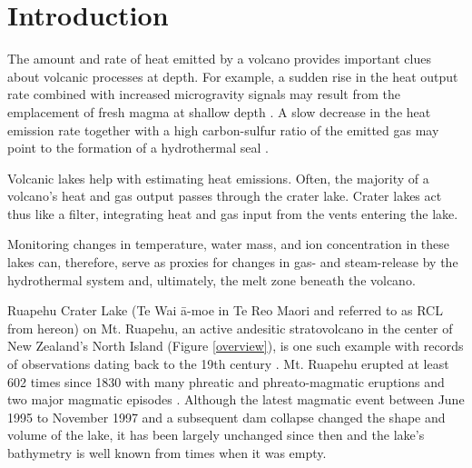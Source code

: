 \documentclass[doublespacing]{bmcart}
\begin{document}


\section{Introduction}

The amount and rate of heat emitted by a volcano provides important clues about
volcanic processes at depth. For example, a sudden rise in the heat output rate
combined with increased microgravity signals may result from the emplacement of
fresh magma at shallow depth \cite{Brown1991}. A slow decrease in the heat
emission rate together with a high carbon-sulfur ratio of the emitted gas may
point to the formation of a hydrothermal seal
\cite{christensonCyclicProcessesFactors2010}.

Volcanic lakes help with estimating heat emissions. Often, the majority of a
volcano's heat and gas output passes through the crater lake. Crater lakes act thus
like a filter, integrating heat and gas input from the vents entering the lake.

Monitoring changes in temperature, water mass, and ion concentration in these
lakes can, therefore, serve as proxies for changes in gas- and steam-release by
the hydrothermal system and, ultimately, the melt zone beneath the volcano. 

Ruapehu Crater Lake (Te Wai \={a}-moe in Te Reo Maori and referred to as RCL from
hereon) on Mt. Ruapehu, an active andesitic stratovolcano in the center of New
Zealand's North Island (Figure \ref{overview}), is one such example with records
of observations dating back to the 19th century \cite{Friedlander1898}. Mt.
Ruapehu erupted at least 602 times since 1830 with many phreatic and
phreato-magmatic eruptions and two major magmatic episodes
\citep{Scott2013,HistoricEruptiveActivity2022}. Although the latest magmatic
event between June 1995 to November 1997 and a subsequent dam collapse changed
the shape and volume of the lake, it has been largely unchanged since then and
the lake's bathymetry is well known from times when it was empty.
\end{document}
